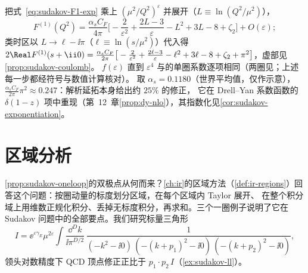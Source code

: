 把式~\eqref{eq:sudakov-F1-exp} 乘上 $(\mu^2/Q^2)^\varepsilon$ 并展开（$L\equiv\ln(Q^2/\mu^2)$），
\begin{equation}\label{eq:sudakov-F1-L}
F^{(1)}(Q^2)=\frac{\alpha_sC_F}{4\pi}\Big[-\frac2{\varepsilon^2}+\frac{2L-3}{\varepsilon}-L^2+3L-8+\zeta_2\Big]+O(\varepsilon);
\end{equation}
类时区以 $L\to\ell-\ii\pi$（$\ell\equiv\ln(s/\mu^2)$）代入得 $2\Real F^{(1)}(s+\ii0)=\frac{\alpha_sC_F}{2\pi}\big[-\frac2{\varepsilon^2}+\frac{2\ell-3}{\varepsilon}-\ell^2+3\ell-8+\zeta_2+\pi^2\big]$，虚部见\cref{prop:sudakov-coulomb}。
$f(\varepsilon)$ 直到 $\varepsilon^4$ 与\cite[式~(3.5)]{MochVermaserenVogt2005}的单圈系数逐项相同（两圈见\cite{Gonsalves1983}；上述每一步都经符号与数值计算核对）。%
取 $\alpha_s=0.1180$（世界平均值\cite{ParticleDataGroup:2024cfk}，仅作示意），$\frac{\alpha_sC_F}{2\pi}\pi^2\approx0.247$：解析延拓本身给出约 $25\%$ 的修正，
它在 Drell--Yan 系数函数的 $\delta(1-z)$ 项中重现（第~12~章\cref{prop:dy-nlo}），其指数化见\cref{cor:sudakov-exponentiation}。
\section{区域分析}\label{sec:sudakov-regions}

\cref{prop:sudakov-oneloop}的双极点从何而来？\cref{ch:ir}的区域方法（\cref{def:ir-regions}）回答这个问题：按圈动量的标度划分区域，在每个区域内 Taylor 展开、
在整个积分域上用维数正规化积分、丢掉无标度积分，再求和。三个一圈例子说明了它在 Sudakov 问题中的全部要点。我们研究标量三角形
\begin{equation}\label{eq:sudakov-triangle}
I=\ee^{\varepsilon\gamma_E}\mu^{2\varepsilon}\int\!\frac{\dd^Dk}{\ii\pi^{D/2}}\,
\frac{1}{(-k^2-\ii0)\,(-(k+p_1)^2-\ii0)\,(-(k+p_2)^2-\ii0)},
\end{equation}
领头对数精度下 QCD 顶点修正正比于 $p_1\cdot p_2\,I$（\cref{ex:sudakov-ll}）。

